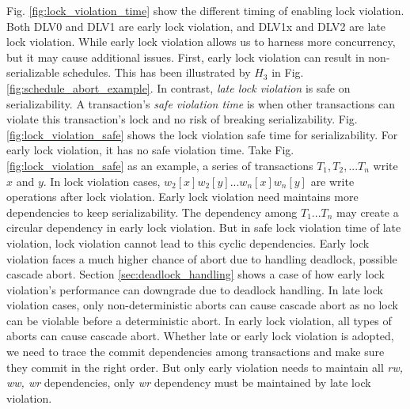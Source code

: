 \documentclass[conference]{IEEEtran}
\begin{document}
Fig. \ref{fig:lock_violation_time} show the different timing of enabling lock violation.
Both DLV0 and DLV1 are early lock violation, and DLV1x and DLV2 are late lock violation.
While early lock violation allows us to harness more concurrency, but it may cause additional issues. 
First, early lock violation can result in non-serializable schedules. This has been illustrated by ${H_3}$ in Fig.   \ref{fig:schedule_abort_example}.
In contrast, \emph{late lock violation} is safe on serializability. 
A transaction's \emph{safe violation time} is when other transactions can violate this transaction's lock  and no risk of breaking serializability.
Fig. \ref{fig:lock_violation_safe}
shows the lock violation safe time for serializability.
For early lock violation, it has no safe violation time.
Take Fig.\ref{fig:lock_violation_safe} as an example,
a series of transactions ${T_1, T_2, ... T_n}$ write ${x}$ and ${y}$.
In lock violation cases, ${w_2[x]w_2[y]... w_{n}[x]w_{n}[y]}$ are write operations after lock violation.
Early lock violation need maintains more dependencies to keep serializability.
The dependency among ${T_1... T_n}$ may create a circular dependency in early lock violation.
But in safe lock violation time of late violation, lock violation cannot lead to this cyclic dependencies.
Early lock violation faces a much higher chance of abort due to handling deadlock,
possible cascade abort.
Section \ref{sec:deadlock_handling}
shows a case of how early lock violation's performance can downgrade due to deadlock handling.
In late lock violation cases, only non-deterministic aborts can cause cascade abort as no lock can be violable before a deterministic abort. 
In early lock violation, all types of aborts can cause cascade abort.
Whether late or early lock violation is adopted, we need to trace the commit dependencies among transactions and make sure they commit in the right order.
But only early violation needs to maintain all \emph{rw, ww, wr} dependencies, only \emph{wr} dependency must be maintained by late lock violation.
\end{document}
